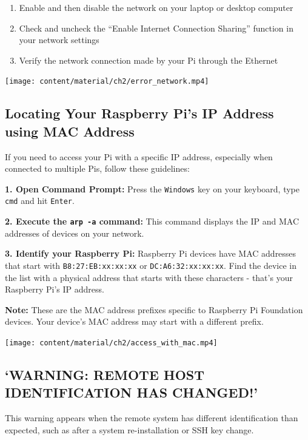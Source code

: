 \documentclass[
  letterpaper,
]{scrbook}
\providecommand{\tightlist}{%
  \setlength{\itemsep}{0pt}\setlength{\parskip}{0pt}}\usepackage{longtable,booktabs,array}
\begin{document}
\begin{enumerate}
\def\labelenumi{\arabic{enumi}.}
\tightlist
\item
  Enable and then disable the network on your laptop or desktop computer
\item
  Check and uncheck the ``Enable Internet Connection Sharing'' function
  in your network settings
\item
  Verify the network connection made by your Pi through the Ethernet
\end{enumerate}

\texttt{[image: content/material/ch2/error\_network.mp4]}

\subsection{Locating Your Raspberry Pi's IP Address using MAC
Address}\label{locating-your-raspberry-pis-ip-address-using-mac-address}

If you need to access your Pi with a specific IP address, especially
when connected to multiple Pis, follow these guidelines:

\textbf{1. Open Command Prompt:} Press the \texttt{Windows} key on your
keyboard, type \texttt{cmd} and hit \texttt{Enter}.

\textbf{2. Execute the \texttt{arp\ -a} command:} This command displays
the IP and MAC addresses of devices on your network.

\textbf{3. Identify your Raspberry Pi:} Raspberry Pi devices have MAC
addresses that start with \texttt{B8:27:EB:xx:xx:xx} or
\texttt{DC:A6:32:xx:xx:xx}. Find the device in the list with a physical
address that starts with these characters - that's your Raspberry Pi's
IP address.

\textbf{Note:} These are the MAC address prefixes specific to Raspberry
Pi Foundation devices. Your device's MAC address may start with a
different prefix.

\texttt{[image: content/material/ch2/access\_with\_mac.mp4]}

\subsection{`WARNING: REMOTE HOST IDENTIFICATION HAS
CHANGED!'}\label{warning-remote-host-identification-has-changed}

This warning appears when the remote system has different identification
than expected, such as after a system re-installation or SSH key change.
\end{document}
